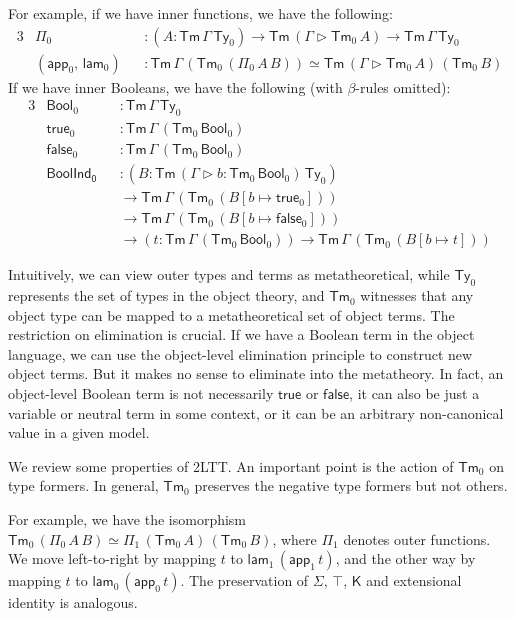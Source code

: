\documentclass[12pt,a4paper,twoside,openany]{book}
\theoremstyle{remark}
\theoremstyle{definition}
\newcommand{\ms}[1]{\mathsf{#1}}
\newcommand{\Tm}{\mathsf{Tm}}
\newcommand{\Ty}{\mathsf{Ty}}
\newcommand{\ext}{\triangleright}
\newcommand{\K}{\mathsf{K}}
\newcommand{\app}{\ms{app}}
\newcommand{\Bool}{\ms{Bool}}
\newcommand{\lam}{\ms{lam}}
\newcommand{\true}{\ms{true}}
\newcommand{\false}{\ms{false}}
\begin{document}
For example, if we have inner functions, we have the following:
\begin{alignat*}{3}
  &\Pi_0 &&: (A : \Tm\,\Gamma\,\Ty_0) \to \Tm\,(\Gamma \ext \Tm_0\,A) \to \Tm\,\Gamma\,\Ty_0\\
  &(\app_0,\,\lam_0) &&: \Tm\,\Gamma\,(\Tm_0\,(\Pi_0\,A\,B)) \simeq \Tm\,(\Gamma \ext \Tm_0\,A)\,(\Tm_0\,B)
\end{alignat*}
If we have inner Booleans, we have the following (with $\beta$-rules omitted):
\begin{alignat*}{3}
  &\Bool_0 &&: \Tm\,\Gamma\,\Ty_0\\
  &\true_0 &&: \Tm\,\Gamma\,(\Tm_0\,\Bool_0)\\
  &\false_0 &&: \Tm\,\Gamma\,(\Tm_0\,\Bool_0)\\
  & \ms{BoolInd_0} &&: (B : \Tm\,(\Gamma\ext b : \Tm_0\,\Bool_0)\,\Ty_0)\\
  & && \to \Tm\,\Gamma\,(\Tm_0\,(B[b \mapsto \true_0]))\\
  & &&\to \Tm\,\Gamma\,(\Tm_0\,(B[b \mapsto \false_0]))\\
  & && \to (t : \Tm\,\Gamma\,(\Tm_0\,\Bool_0)) \to \Tm\,\Gamma\,(\Tm_0\,(B[b \mapsto t]))
\end{alignat*}

Intuitively, we can view outer types and terms as metatheoretical, while $\Ty_0$
represents the set of types in the object theory, and $\Tm_0$ witnesses that any
object type can be mapped to a metatheoretical set of object terms. The
restriction on elimination is crucial. If we have a Boolean term in the object
language, we can use the object-level elimination principle to construct new
object terms. But it makes no sense to eliminate into the metatheory. In fact,
an object-level Boolean term is not necessarily $\true$ or $\false$, it can also
be just a variable or neutral term in some context, or it can be an arbitrary
non-canonical value in a given model.

We review some properties of 2LTT. An important point is the action of $\Tm_0$
on type formers. In general, $\Tm_0$ preserves the negative type formers but not
others.

For example, we have the isomorphism $\Tm_0\,(\Pi_0\,A\,B) \simeq
\Pi_1\,(\Tm_0\,A)\,(\Tm_0\,B)$, where $\Pi_1$ denotes outer functions.  We move
left-to-right by mapping $t$ to $\lam_1\,(\app_1\,t)$, and the other way by
mapping $t$ to $\lam_0\,(\app_0\,t)$. The preservation of $\Sigma$, $\top$, $\K$
and extensional identity is analogous.
\end{document}
